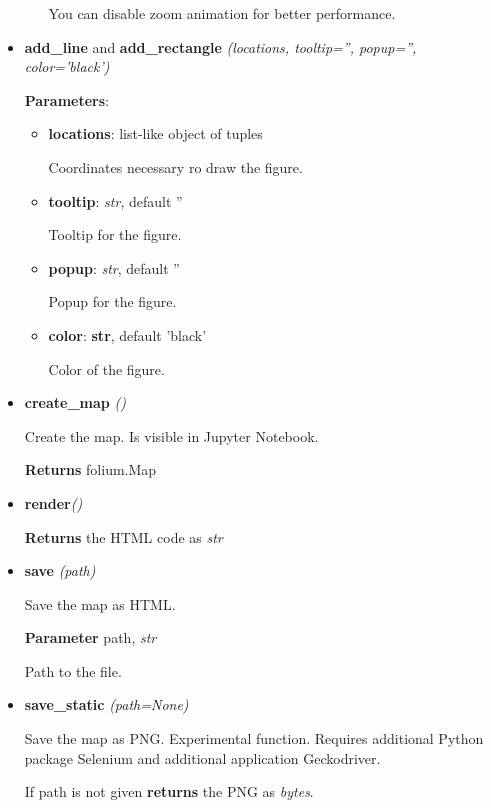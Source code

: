 \documentclass[a4paper,12pt]{article}
\begin{document}
\begin{itemize}
\begin{itemize}
  You can disable zoom animation for better performance.
 
 \end{itemize}
 
 \item \textbf{add\_line} and \textbf{add\_rectangle} \textit{(locations, tooltip='', popup='', color='black')}
 
 \textbf{Parameters}:
 \begin{itemize}
  \item \textbf{locations}: list-like object of tuples
  
  Coordinates necessary ro draw the figure.
  
  \item \textbf{tooltip}: \textit{str}, default ''
  
  Tooltip for the figure.
  
  \item \textbf{popup}: \textit{str}, default ''
  
  Popup for the figure.
  
  \item \textbf{color}: \textbf{str}, default 'black'
  
  Color of the figure.
  
 \end{itemize}

 
 \item \textbf{create\_map} \textit{()}
 
 Create the map. Is visible in Jupyter Notebook.
 
 \textbf{Returns} folium.Map
 
 \item \textbf{render}\textit{()}
 
 \textbf{Returns} the HTML code as \textit{str}
 
 \item \textbf{save} \textit{(path)}
 
 Save the map as HTML.
 
 \textbf{Parameter} path, \textit{str}
 
 Path to the file.
 
 \item \textbf{save\_static} \textit{(path=None)}
 
 Save the map as PNG. Experimental function. Requires additional Python package Selenium and additional application Geckodriver.
 
 If path is not given \textbf{returns} the PNG as \textit{bytes}.

\end{itemize}
\end{document}
